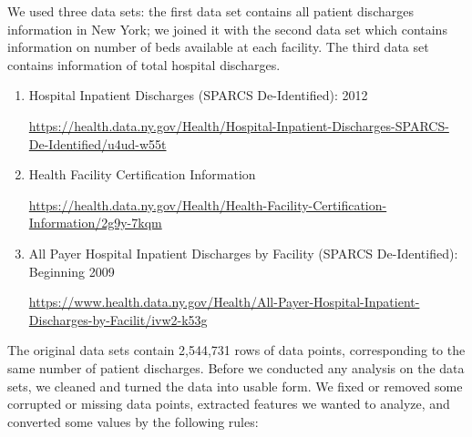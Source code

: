 \documentclass[letterpaper,11pt]{article}
\begin{document}
We used three data sets: the first data set contains all patient discharges information in New York; we joined it with the second data set which contains information on number of beds available at each facility. The third data set contains information of total hospital discharges.

\begin{enumerate}
  \item Hospital Inpatient Discharges (SPARCS De-Identified): 2012
  
  \url{https://health.data.ny.gov/Health/Hospital-Inpatient-Discharges-SPARCS-De-Identified/u4ud-w55t}
  
  \item Health Facility Certification Information
  
  \url{https://health.data.ny.gov/Health/Health-Facility-Certification-Information/2g9y-7kqm}
  
  \item All Payer Hospital Inpatient Discharges by Facility (SPARCS De-Identified): Beginning 2009
  
  \url{https://www.health.data.ny.gov/Health/All-Payer-Hospital-Inpatient-Discharges-by-Facilit/ivw2-k53g}
  
\end{enumerate}


The original data sets contain 2,544,731 rows of data points, corresponding to the same number of patient discharges. Before we conducted any analysis on the data sets, we cleaned and turned the data into usable form. We fixed or removed some corrupted or missing data points, extracted features we wanted to analyze, and converted some values by the following rules:
\end{document}

